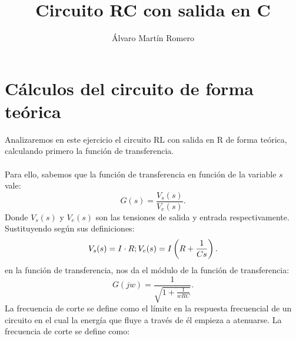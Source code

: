 \documentclass[11pt,letterpaper]{article}
\title{Circuito RC con salida en C}
\author{Álvaro Martín Romero}
\begin{document}
\maketitle
\section{Cálculos del circuito de forma teórica}%
\label{sec:Ejercicio 1}
Analizaremos en este ejercicio el circuito RL con salida en R de forma teórica, calculando primero la función de transferencia.\\
\\
Para ello, sabemos que la función de transferencia en función de la variable $s$ vale:
\[
	G(s)=\frac{V_s(s)}{V_e(s)}
.\] 
Donde $V_s(s)$ y $V_e(s)$ son las tensiones de salida y entrada respectivamente. Sustituyendo según sus definiciones:
\[
	V_s(s)=I\cdot R; \\ \\ \\ \\  \\ V_e(s)=I\left( R+\frac{1}{Cs} \right) 
.\] 
en la función de transferencia, nos da el módulo de la función de transferencia:
\[
	G(jw)=\frac{1}{\sqrt{1+\frac{1}{wRC}} }
.\] 
La frecuencia de corte se define como el límite en la respuesta frecuencial de un circuito en el cual la energía que fluye a través de él empieza a atenuarse. La frecuencia de corte se define como:
\end{document}
